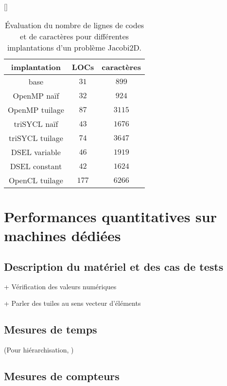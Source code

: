\begin{table}
[\FBwidth]
{
\caption{Évaluation du nombre de lignes de codes et de caractères pour différentes implantations d'un problème Jacobi2D.}
\label{tab:eval_qual}
}
{
\begin{tabular}{||c||c|c||}
\hline
implantation & LOCs & caractères \\
\hline
\hline
base & $31$ & $899$ \\
\hline
OpenMP naïf & $32$ & $924$ \\
\hline
OpenMP tuilage & $87$ & $3115$ \\
\hline
triSYCL naïf & $43$ & $1676$ \\
\hline
triSYCL tuilage & $74$ & $3647$ \\
\hline
DSEL variable & $46$ & $1919$ \\
\hline
DSEL constant & $42$ & $1624$ \\
\hline
OpenCL tuilage & $177$ & $6266$ \\
\hline
\end{tabular}
}
\end{table}


\section{Performances quantitatives sur machines dédiées}

\subsection{Description du matériel et des cas de tests}
\label{sec:desc_mat_tests}



+ Vérification des valeurs numériques

+ Parler des tuiles au sens vecteur d'éléments

\subsection{Mesures de temps}

(Pour hiérarchisation, \cite{Ths3,Ths4})


\subsection{Mesures de compteurs}

